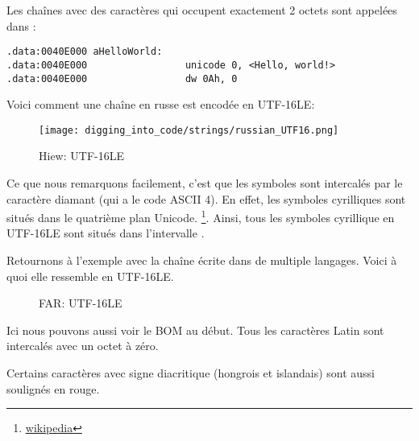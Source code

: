 Les chaînes avec des caractères qui occupent exactement 2 octets sont appelées 
dans \IDA:

\begin{lstlisting}[style=customasmx86]
.data:0040E000 aHelloWorld:
.data:0040E000                 unicode 0, <Hello, world!>
.data:0040E000                 dw 0Ah, 0
\end{lstlisting}

Voici comment une chaîne en russe est encodée en UTF-16LE:

\begin{figure}[H]
\centering
\texttt{[image: digging\_into\_code/strings/russian\_UTF16.png]}
\caption{Hiew: UTF-16LE}
\end{figure}

Ce que nous remarquons facilement, c'est que les symboles sont intercalés par le
caractère diamant (qui a le code ASCII 4). En effet, les symboles cyrilliques sont
situés dans le quatrième plan Unicode.
\footnote{\href{http://go.yurichev.com/17003}{wikipedia}}.
Ainsi, tous les symboles cyrillique en UTF-16LE sont situés dans l'intervalle .

Retournons à l'exemple avec la chaîne écrite dans de multiple langages.
Voici à quoi elle ressemble en UTF-16LE.

\begin{figure}[H]
\centering
{}
\caption{FAR: UTF-16LE}
\end{figure}

Ici nous pouvons aussi voir le \ac{BOM} au début.
Tous les caractères Latin sont intercalés avec un octet à zéro.

Certains caractères avec signe diacritique (hongrois et islandais) sont aussi soulignés en rouge.



